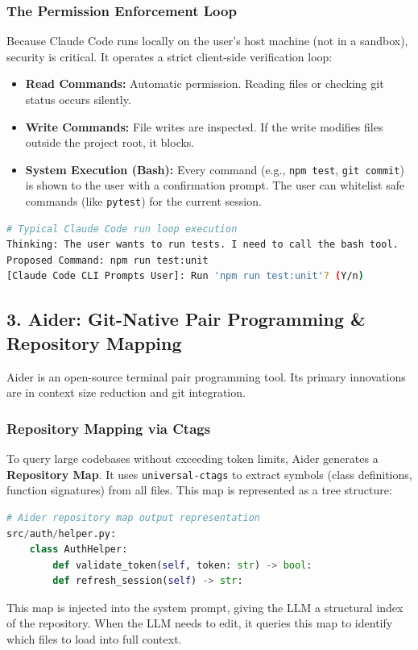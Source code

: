 \subsubsection{The Permission Enforcement Loop}
Because Claude Code runs locally on the user's host machine (not in a sandbox), security is critical. It operates a strict client-side verification loop:
\begin{itemize}
    \item \textbf{Read Commands:} Automatic permission. Reading files or checking git status occurs silently.
    \item \textbf{Write Commands:} File writes are inspected. If the write modifies files outside the project root, it blocks.
    \item \textbf{System Execution (Bash):} Every command (e.g., \texttt{npm test}, \texttt{git commit}) is shown to the user with a confirmation prompt. The user can whitelist safe commands (like \texttt{pytest}) for the current session.
\end{itemize}

\begin{lstlisting}[language=Bash]
# Typical Claude Code run loop execution
Thinking: The user wants to run tests. I need to call the bash tool.
Proposed Command: npm run test:unit
[Claude Code CLI Prompts User]: Run 'npm run test:unit'? (Y/n)
\end{lstlisting}

\subsection{3. Aider: Git-Native Pair Programming \& Repository Mapping}

Aider is an open-source terminal pair programming tool. Its primary innovations are in context size reduction and git integration.

\subsubsection{Repository Mapping via Ctags}
To query large codebases without exceeding token limits, Aider generates a \textbf{Repository Map}. It uses \texttt{universal-ctags} to extract symbols (class definitions, function signatures) from all files. This map is represented as a tree structure:
\begin{lstlisting}[language=Python]
# Aider repository map output representation
src/auth/helper.py:
    class AuthHelper:
        def validate_token(self, token: str) -> bool:
        def refresh_session(self) -> str:
\end{lstlisting}
This map is injected into the system prompt, giving the LLM a structural index of the repository. When the LLM needs to edit, it queries this map to identify which files to load into full context.


